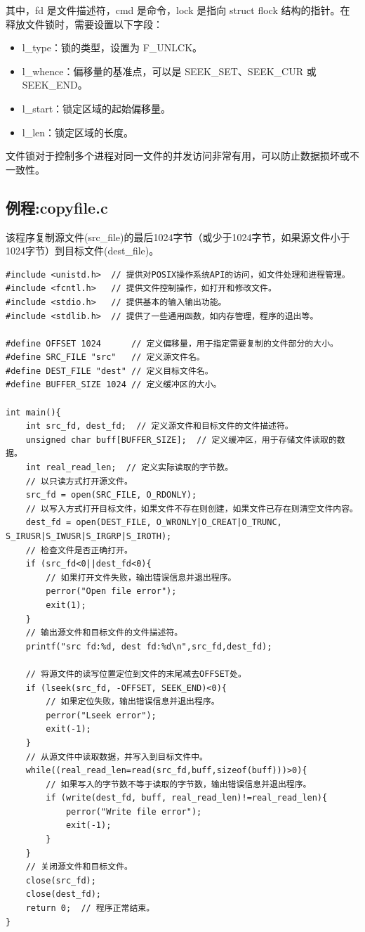 \documentclass[12pt, a4paper, oneside]{ctexbook}
\numberwithin{figure}{section}
\begin{document}
其中，fd 是文件描述符，cmd 是命令，lock 是指向 struct flock 结构的指针。在释放文件锁时，需要设置以下字段：

\begin{itemize}
\item l_type：锁的类型，设置为 F_UNLCK。
\item l_whence：偏移量的基准点，可以是 SEEK_SET、SEEK_CUR 或 SEEK_END。
\item l_start：锁定区域的起始偏移量。
\item l_len：锁定区域的长度。
\end{itemize}

文件锁对于控制多个进程对同一文件的并发访问非常有用，可以防止数据损坏或不一致性。


\subsection{例程:copyfile.c}

该程序复制源文件(src_file)的最后1024字节（或少于1024字节，如果源文件小于1024字节）到目标文件(dest_file)。

\begin{verbatim}
#include <unistd.h>  // 提供对POSIX操作系统API的访问，如文件处理和进程管理。
#include <fcntl.h>   // 提供文件控制操作，如打开和修改文件。
#include <stdio.h>   // 提供基本的输入输出功能。
#include <stdlib.h>  // 提供了一些通用函数，如内存管理，程序的退出等。

#define OFFSET 1024      // 定义偏移量，用于指定需要复制的文件部分的大小。
#define SRC_FILE "src"   // 定义源文件名。
#define DEST_FILE "dest" // 定义目标文件名。
#define BUFFER_SIZE 1024 // 定义缓冲区的大小。

int main(){
    int src_fd, dest_fd;  // 定义源文件和目标文件的文件描述符。
    unsigned char buff[BUFFER_SIZE];  // 定义缓冲区，用于存储文件读取的数据。
    int real_read_len;  // 定义实际读取的字节数。
    // 以只读方式打开源文件。
    src_fd = open(SRC_FILE, O_RDONLY);
    // 以写入方式打开目标文件，如果文件不存在则创建，如果文件已存在则清空文件内容。
    dest_fd = open(DEST_FILE, O_WRONLY|O_CREAT|O_TRUNC, S_IRUSR|S_IWUSR|S_IRGRP|S_IROTH);
    // 检查文件是否正确打开。
    if (src_fd<0||dest_fd<0){
        // 如果打开文件失败，输出错误信息并退出程序。
        perror("Open file error");
        exit(1);
    }
    // 输出源文件和目标文件的文件描述符。
    printf("src fd:%d, dest fd:%d\n",src_fd,dest_fd);

    // 将源文件的读写位置定位到文件的末尾减去OFFSET处。
    if (lseek(src_fd, -OFFSET, SEEK_END)<0){
        // 如果定位失败，输出错误信息并退出程序。
        perror("Lseek error");
        exit(-1);
    }
    // 从源文件中读取数据，并写入到目标文件中。
    while((real_read_len=read(src_fd,buff,sizeof(buff)))>0){
        // 如果写入的字节数不等于读取的字节数，输出错误信息并退出程序。
        if (write(dest_fd, buff, real_read_len)!=real_read_len){
            perror("Write file error");
            exit(-1);
        }
    }        
    // 关闭源文件和目标文件。
    close(src_fd);
    close(dest_fd);
    return 0;  // 程序正常结束。
}

\end{verbatim}
\end{document}
